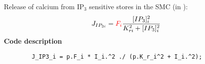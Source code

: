 \documentclass[fleqn]{report}
\numberwithin{equation}{section}
\numberwithin{equation}{section}
\newcommand{\Cai}{\text{[Ca$^{2+}]_i$}}
\begin{document}
% 			           
		
% 	
% 						
% 						
% 	
 		Release of calcium from IP$_{3}$ sensitive stores in the SMC (in \uMps):
 		\begin{equation} \label{eq:IP3i}
 		J_{IP_{3i}} = \textcolor{red}{F_{i}}\frac{[IP_{3}]_{i}^{2}}{K_{ri}^{2}+[IP_{3}]_{i}^{2}}
 		\end{equation}
 		\textbf{Code description}
 		\begin{verbatim}
 		J_IP3_i = p.F_i * I_i.^2 ./ (p.K_r_i^2 + I_i.^2);
 		\end{verbatim}
\end{document}
